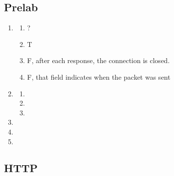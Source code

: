 \documentclass[12pt]{article}
\title{\assignmenttype}
\author{Daniel Andronov}
\date{\displaydate{date}}
\begin{document}
\maketitle
\newpage

\subsection{Prelab}
\begin{enumerate}[label=\textbf{Question \arabic*)}]
	\item  \begin{enumerate}[label=\alph*)]
			\item ? 
			\item T
			\item F, after each response, the connection is closed. 
			\item F, that field indicates when the packet was sent
		\end{enumerate}
	\item  \begin{enumerate}[label=\alph*)]
			\item  
			\item 
			\item 
		\end{enumerate}
	\item
	\item
	\item
\end{enumerate}

\subsection{HTTP}
\end{document}
